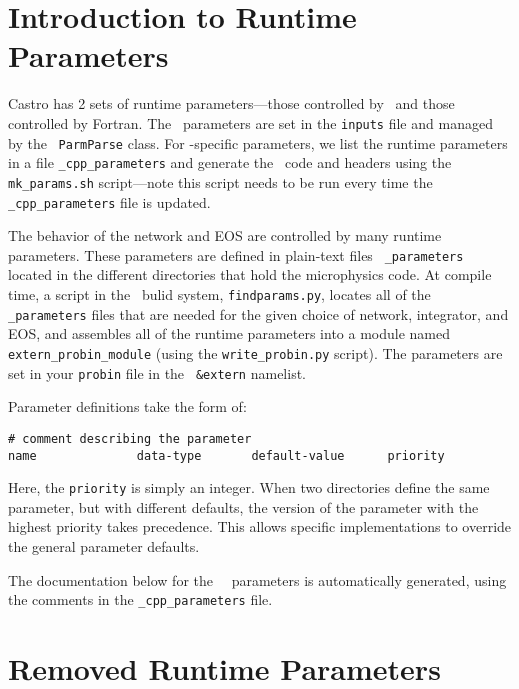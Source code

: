 \label{chapter:parameters}

\section{Introduction to Runtime Parameters}

Castro has 2 sets of runtime parameters---those controlled by
\cpp\ and those controlled by Fortran.  The \cpp\ parameters are set
in the {\tt inputs} file and managed by the \amrex\ {\tt ParmParse}
class.  For \castro-specific parameters, we list the runtime
parameters in a file {\tt \_cpp\_parameters} and generate the
\cpp\ code and headers using the {\tt mk\_params.sh} script---note
this script needs to be run every time the {\tt \_cpp\_parameters}
file is updated.

The behavior of the network and EOS are controlled by many runtime
parameters.  These parameters are defined in plain-text files {\tt
  \_parameters} located in the different directories that hold the
microphysics code.  At compile time, a script in the \amrex\ bulid
system, {\tt findparams.py}, locates all of the {\tt \_parameters}
files that are needed for the given choice of network, integrator, and
EOS, and assembles all of the runtime parameters into a module named
{\tt extern\_probin\_module} (using the {\tt write\_probin.py}
script).  The parameters are set in your {\tt probin} file in the {\tt
  \&extern} namelist.

Parameter definitions take the form of:
\begin{verbatim}
# comment describing the parameter
name              data-type       default-value      priority
\end{verbatim}
Here, the {\tt priority} is simply an integer.  When two directories
define the same parameter, but with different defaults, the version of
the parameter with the highest priority takes precedence.  This allows
specific implementations to override the general parameter defaults.

The documentation below for the \castro\ \cpp\ parameters is
automatically generated, using the comments in the {\tt \_cpp\_parameters}
file.



\section{Removed Runtime Parameters}

